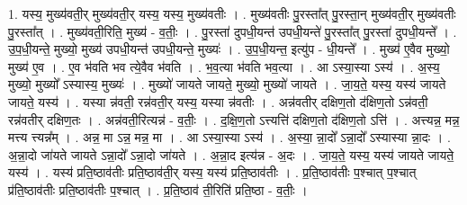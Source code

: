 \documentclass[17pt]{extarticle}
\begin{document}
1. यस्य॒ मुख्य॑वती॒र् मुख्य॑वती॒र् यस्य॒ यस्य॒ मुख्य॑वतीः । . मुख्य॑वतीः पु॒रस्ता᳚त् पु॒रस्ता॒न् मुख्य॑वती॒र् मुख्य॑वतीः पु॒रस्ता᳚त् । . मुख्य॑वती॒रिति॒ मुख्य॑ - व॒तीः॒ । . पु॒रस्ता॑ दुपधी॒यन्त॑ उपधी॒यन्ते॑ पु॒रस्ता᳚त् पु॒रस्ता॑ दुपधी॒यन्ते᳚ । . उ॒प॒धी॒यन्ते॒ मुख्यो॒ मुख्य॑ उपधी॒यन्त॑ उपधी॒यन्ते॒ मुख्यः॑ । . उ॒प॒धी॒यन्त॒ इत्यु॑प - धी॒यन्ते᳚ । . मुख्य॑ ए॒वैव मुख्यो॒ मुख्य॑ ए॒व । . ए॒व भ॑वति भव त्ये॒वैव भ॑वति । . भ॒व॒त्या भ॑वति भव॒त्या । . आ ऽस्या॒स्या ऽस्य॑ । . अ॒स्य॒ मुख्यो॒ मुख्यो᳚ ऽस्यास्य॒ मुख्यः॑ । . मुख्यो॑ जायते जायते॒ मुख्यो॒ मुख्यो॑ जायते । . जा॒य॒ते॒ यस्य॒ यस्य॑ जायते जायते॒ यस्य॑ । . यस्या न्न॑वती॒ रन्न॑वती॒र् यस्य॒ यस्या न्न॑वतीः । . अन्न॑वतीर् दक्षिण॒तो द॑क्षिण॒तो ऽन्न॑वती॒ रन्न॑वतीर् दक्षिण॒तः । . अन्न॑वती॒रित्यन्न॑ - व॒तीः॒ । . द॒क्षि॒ण॒तो ऽत्त्यत्ति॑ दक्षिण॒तो द॑क्षिण॒तो ऽत्ति॑ । . अत्त्यन्न॒ मन्न॒ मत्त्य त्त्यन्न᳚म् । . अन्न॒ मा ऽन्न॒ मन्न॒ मा । . आ ऽस्या॒स्या ऽस्य॑ । . अ॒स्या॒ न्ना॒दो᳚ ऽन्ना॒दो᳚ ऽस्यास्या न्ना॒दः । . अ॒न्ना॒दो जा॑यते जायते ऽन्ना॒दो᳚ ऽन्ना॒दो जा॑यते । . अ॒न्ना॒द इत्य॑न्न - अ॒दः । . जा॒य॒ते॒ यस्य॒ यस्य॑ जायते जायते॒ यस्य॑ । . यस्य॑ प्रति॒ष्ठाव॑तीः प्रति॒ष्ठाव॑ती॒र् यस्य॒ यस्य॑ प्रति॒ष्ठाव॑तीः । . प्र॒ति॒ष्ठाव॑तीः प॒श्चात् प॒श्चात् प्र॑ति॒ष्ठाव॑तीः प्रति॒ष्ठाव॑तीः प॒श्चात् । . प्र॒ति॒ष्ठाव॑ ती॒रिति॑ प्रति॒ष्ठा - व॒तीः॒ । \newline
\end{document}
